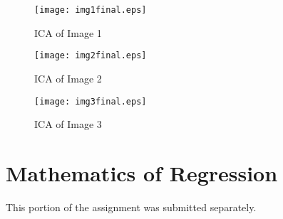 \documentclass[11pt, oneside]{article}
\begin{document}
\begin{figure}[ht!]
\texttt{[image: img1final.eps]}
\caption{ICA of Image 1}
\label{fig:ICAimg1}
\end{figure}

\begin{figure}[ht!]
\texttt{[image: img2final.eps]}
\caption{ICA of Image 2}
\label{fig:ICAimg2}
\end{figure}

\begin{figure}[ht!]
\texttt{[image: img3final.eps]}
\caption{ICA of Image 3}
\label{fig:ICAimg3}
\end{figure}


\section{Mathematics of Regression}

This portion of the assignment was submitted separately.
\end{document}
